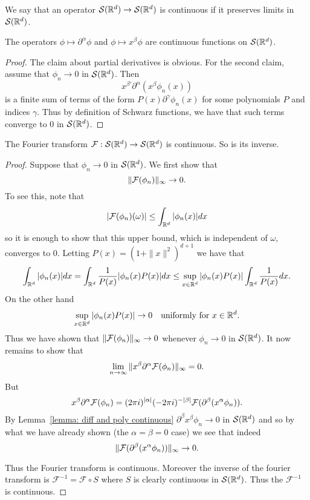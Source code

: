 \documentclass[twoside, a4paper, 10pt]{amsart}
\begin{document}
We say that an operator $\mathcal{S}(\mathbb{R}^d) \to \mathcal{S}(\mathbb{R}^d)$ is continuous if it preserves limits in $\mathcal{S}(\mathbb{R}^d)$.

\begin{lemma}\label{lemma: diff and poly continuous} The operators $\phi \mapsto \partial^{\alpha}\phi$ and $\phi \mapsto x^{\beta}\phi$ are continuous functions on $\mathcal{S}(\mathbb{R}^d)$.

\end{lemma}

\begin{proof} The claim about partial derivatives is obvious. For the second claim, assume that $\phi_n \to 0$ in $\mathcal{S}(\mathbb{R}^d)$. Then $$x^{\beta'} \partial^{\alpha} (x^{\beta} \phi_n(x))$$ is a finite sum of terms of the form $P(x)\partial^{\gamma}\phi_n(x)$ for some polynomials $P$ and indices $\gamma$. Thus by definition of Schwarz functions, we have that such terms converge to $0$ in $\mathcal{S}(\mathbb{R}^d)$. \end{proof}

\begin{prop}\label{prop: fourier continuous on schwarz} The Fourier transform $\mathcal{F}:\mathcal{S}(\mathbb{R}^d) \to \mathcal{S}(\mathbb{R}^d)$ is continuous. So is its inverse.

\end{prop}

\begin{proof} Suppose that $\phi_n \to 0$ in $\mathcal{S}(\mathbb{R}^d)$. We first show that $$\| \mathcal{F}(\phi_n)\|_{\infty} \to 0.$$ To see this, note that $$|\mathcal{F}(\phi_n) (\omega)| \leq \int_{\mathbb{R}^d} |\phi_n(x)| dx$$ so it is enough to show that this upper bound, which is independent of $\omega$, converges to $0$. Letting $P(x) = (1 + \|x\|^2)^{d+1}$ we have that $$\int_{\mathbb{R}^d}|\phi_n(x)| dx = \int_{\mathbb{R}^d} \frac{1}{P(x)} |\phi_n(x)P(x)| dx \leq \sup_{x \in \mathbb{R}^d} |\phi_n(x)P(x)|  \int_{\mathbb{R}^d} \frac{1}{P(x)} dx.$$ On the other hand $$\sup_{x \in \mathbb{R}^d} |\phi_n(x)P(x)| \to 0 \quad\text{uniformly for } x \in \mathbb{R}^d.$$ Thus we have shown that $\|\mathcal{F}(\phi_n)\|_{\infty} \to 0$ whenever $\phi_n \to 0$ in $\mathcal{S}(\mathbb{R}^d)$. It now remains to show that $$\lim_{n \to \infty} \|x^{\beta} \partial^{\alpha} \mathcal{F}(\phi_n)\|_{\infty} = 0.$$ But $$x^{\beta} \partial^{\alpha} \mathcal{F}(\phi_n) = (2\pi i)^{|\alpha|}(-2\pi i)^{-|\beta|} \mathcal{F}(\partial^{\beta} (x^{\alpha} \phi_n)).$$ By Lemma~\ref{lemma: diff and poly continuous} $\partial^{\beta} x^{\beta} \phi_n \to 0$ in $\mathcal{S}(\mathbb{R}^d)$ and so by what we have already shown (the $\alpha = \beta = 0$ case) we see that indeed $$\|\mathcal{F}(\partial^{\beta} (x^{\alpha} \phi_n))\|_{\infty} \to 0.$$

Thus the Fourier transform is continuous. Moreover the inverse of the fourier transform is $\mathcal{F}^{-1} = \mathcal{F} \circ S$ where $S$ is clearly continuous in $\mathcal{S}(\mathbb{R}^d)$. Thus the $\mathcal{F}^{-1}$ is continuous. \end{proof}
\end{document}
